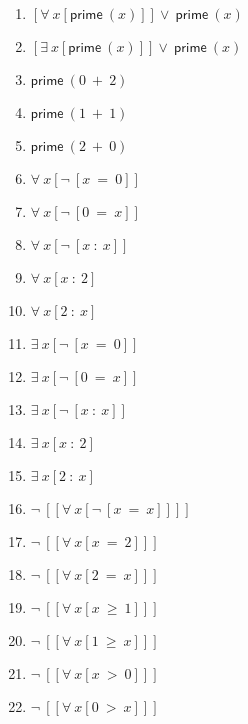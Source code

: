 \documentclass{article}
\begin{document}
\begin{enumerate}
\item $[\forall \ x[\mathsf{prime} \ (x)]]\lor \ \mathsf{prime} \ (x)$

\item $[\exists \ x[\mathsf{prime} \ (x)]]\lor \ \mathsf{prime} \ (x)$

\item $\mathsf{prime} \ (0 \ + \ 2)$

\item $\mathsf{prime} \ (1 \ + \ 1)$

\item $\mathsf{prime} \ (2 \ + \ 0)$

\item $\forall \ x[\neg \ [x \ = \ 0]]$

\item $\forall \ x[\neg \ [0 \ = \ x]]$

\item $\forall \ x[\neg \ [x \ : \ x]]$

\item $\forall \ x[x \ : \ 2]$

\item $\forall \ x[2 \ : \ x]$

\item $\exists \ x[\neg \ [x \ = \ 0]]$

\item $\exists \ x[\neg \ [0 \ = \ x]]$

\item $\exists \ x[\neg \ [x \ : \ x]]$

\item $\exists \ x[x \ : \ 2]$

\item $\exists \ x[2 \ : \ x]$

\item $\neg \ [[\forall \ x[\neg \ [x \ = \ x]]]]$

\item $\neg \ [[\forall \ x[x \ = \ 2]]]$

\item $\neg \ [[\forall \ x[2 \ = \ x]]]$

\item $\neg \ [[\forall \ x[x \ \ge \ 1]]]$

\item $\neg \ [[\forall \ x[1 \ \ge \ x]]]$

\item $\neg \ [[\forall \ x[x \ > \ 0]]]$

\item $\neg \ [[\forall \ x[0 \ > \ x]]]$


\end{enumerate}
\end{document}
